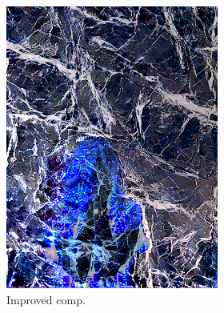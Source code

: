 \begin{figure}[]
\begin{subfigure}{\textwidth}
        \begin{subfigure}{0.24\textwidth}
            \centering
            \includegraphics[width=\textwidth]{images/04-experiment02/human/marble/improved_im.jpg}
            \caption{Improved comp.}
            \label{fig:ex02-human-marble-improved_im}
        \end{subfigure}
        \hfill
        \begin{subfigure}{0.24\textwidth}
            \centering

\end{subfigure}
\end{subfigure}
\end{figure}
